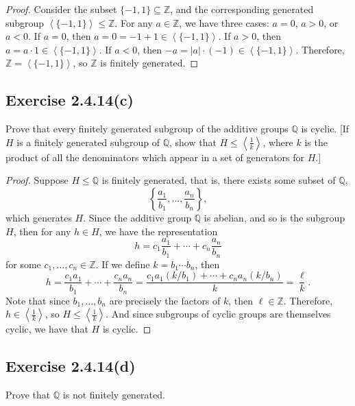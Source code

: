 \documentclass[12pt]{article}
\newenvironment{problem}
    {\begin{lrbox}{\mybox}\begin{minipage}{\textwidth-10pt}}
    {\end{minipage}\end{lrbox}\framebox[6.5in]{\usebox{\mybox}}}
\newcommand{\ds}{\displaystyle}
\newcommand{\<}{\left\langle}
\renewcommand{\>}{\right\rangle}
\newcommand{\Z}{\mathbb{Z}}
\newcommand{\Q}{\mathbb{Q}}
\begin{document}
\begin{proof}
    Consider the subset $\{-1,1\}\subseteq\Z$, and the corresponding generated subgroup $\<\{-1,1\}\>\leq\Z$. For any $a\in\Z$, we have three cases: $a=0$, $a>0$, or $a<0$. If $a=0$, then $a=0=-1+1\in\<\{-1,1\}\>$. If $a>0$, then $a = a\cdot 1 \in\<\{-1,1\}\>$. If $a<0$, then $-a = |a|\cdot(-1) \in\<\{-1,1\}\>$. Therefore, $\Z=\<\{-1,1\}\>$, so $\Z$ is finitely generated.
    
\end{proof}

\subsection*{Exercise 2.4.14(c)}
\begin{problem}
     Prove that every finitely generated subgroup of the additive groups $\Q$ is cyclic. [If $H$ is a finitely generated subgroup of $\Q$, show that $\ds H\leq \<\frac1k\>$, where $k$ is the product of all the denominators which appear in a set of generators for $H$.]
\end{problem}

\begin{proof}
    Suppose $H\leq \Q$ is finitely generated, that is, there exists some subset of $\Q$,
    \[\left\{\frac{a_1}{b_1}, \dots, \frac{a_n}{b_n}\right\},\]
    which generates $H$. Since the additive group $\Q$ is abelian, and so is the subgroup $H$, then for any $h\in H$, we have the representation
    \[h = c_1\frac{a_1}{b_1} + \cdots + c_n\frac{a_n}{b_n}\]
    for some $c_1,\dots,c_n\in\Z$. If we define $k=b_1\cdots b_n$, then
    \[h = \frac{c_1a_1}{b_1} + \cdots + \frac{c_na_n}{b_n} = \frac{c_1a_1(k/b_1) + \cdots + c_na_n(k/b_n)}k = \frac\ell k.\]
    Note that since $b_1,\dots,b_n$ are precisely the factors of $k$, then $\ell\in\Z$. Therefore, $\ds h\in\<\frac1k\>$, so $\ds H\leq\<\frac1k\>$. And since subgroups of cyclic groups are themselves cyclic, we have that $H$ is cyclic.
    
\end{proof}

\subsection*{Exercise 2.4.14(d)}
\begin{problem}
     Prove that $\Q$ is not finitely generated.
\end{problem}
\end{document}

